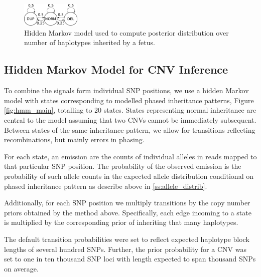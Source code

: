 \begin{figure}[h]
\center\includegraphics[width = 0.25\textwidth]{figures/cov-HMM}
\caption{Hidden Markov model used to compute posterior distribution over number of haplotypes inherited by a fetus.}\label{fig:hmm_coverage}
\end{figure}

\subsection{Hidden Markov Model for CNV Inference}\label{ss:hmm}
To combine the signals form individual SNP positions, we use a hidden Markov model with states corresponding to modelled phased inheritance patterns, Figure \ref{fig:hmm_main}, totalling to 20 states. States representing normal inheritance are central to the model assuming that two CNVs cannot be immediately subsequent. Between states of the same inheritance pattern, we allow for transitions reflecting recombinations, but mainly errors in phasing.

For each state, an emission are the counts of individual alleles in reads mapped to that particular SNP position. The probability of the observed emission is the probability of such allele counts in the expected allele distribution conditional on phased inheritance pattern as describe above in \ref{ss:allele_distrib}.

Additionally, for each SNP position we multiply transitions by the copy number priors obtained by the method above. Specifically, each edge incoming to a state is multiplied by the corresponding prior of inheriting that many haplotypes. %

The default transition probabilities were set to reflect expected haplotype block lengths of several hundred SNPs. Further, the prior probability for a CNV was set to one in ten thousand SNP loci with length expected to span thousand SNPs on average.

